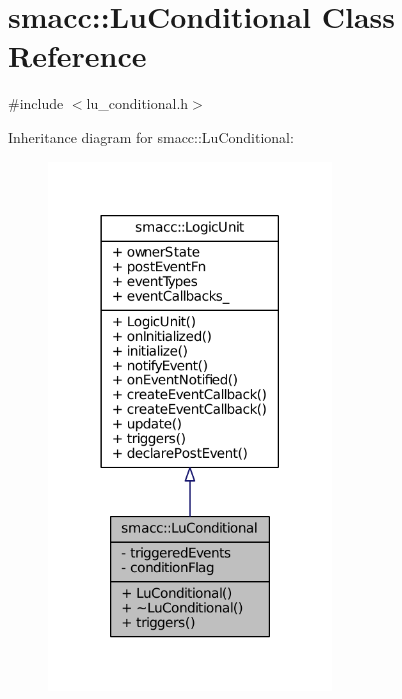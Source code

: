 \hypertarget{classsmacc_1_1LuConditional}{}\section{smacc\+:\+:Lu\+Conditional Class Reference}
\label{classsmacc_1_1LuConditional}


{\ttfamily \#include $<$lu\+\_\+conditional.\+h$>$}



Inheritance diagram for smacc\+:\+:Lu\+Conditional\+:
\nopagebreak
\begin{figure}[H]
\begin{center}
\leavevmode
\includegraphics[width=213pt]{classsmacc_1_1LuConditional__inherit__graph}
\end{center}
\end{figure}


